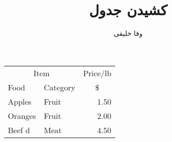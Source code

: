 \documentclass{article}
\title{کشیدن جدول}
\author{وفا خلیقی}
\begin{document}
\begin{latin}
\begin{tabular}{@{}llr@{}}
\toprule
  \multicolumn{2}{c}{Item} &\multicolumn{1}{c}{Price/lb} \\
\cmidrule(r){1-2}\cmidrule(l){3-3}
  Food & Category & \multicolumn{1}{c}{\$}\\
\midrule
  Apples & Fruit  & 1.50  \\
  Oranges & Fruit & 2.00  \\
  Beef d & Meat   & 4.50  \\
\bottomrule
\end{tabular}
\end{latin}
\end{document}
